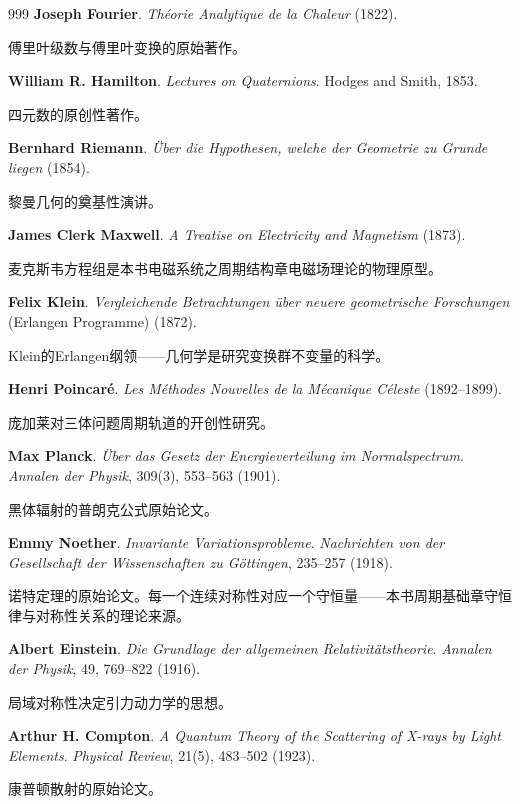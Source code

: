 \begin{thebibliography}{999}
 \textbf{Joseph Fourier}. \textit{Th\'eorie Analytique de la Chaleur} (1822).

傅里叶级数与傅里叶变换的原始著作。

 \textbf{William R. Hamilton}. \textit{Lectures on Quaternions}. Hodges and Smith, 1853.

四元数的原创性著作。

 \textbf{Bernhard Riemann}. \textit{\"Uber die Hypothesen, welche der Geometrie zu Grunde liegen} (1854).

黎曼几何的奠基性演讲。

 \textbf{James Clerk Maxwell}. \textit{A Treatise on Electricity and Magnetism} (1873).

麦克斯韦方程组是本书电磁系统之周期结构章电磁场理论的物理原型。

 \textbf{Felix Klein}. \textit{Vergleichende Betrachtungen \"uber neuere geometrische Forschungen} (Erlangen Programme) (1872).

Klein的Erlangen纲领——几何学是研究变换群不变量的科学。

 \textbf{Henri Poincar\'e}. \textit{Les M\'ethodes Nouvelles de la M\'ecanique C\'eleste} (1892--1899).

庞加莱对三体问题周期轨道的开创性研究。

 \textbf{Max Planck}. \textit{\"Uber das Gesetz der Energieverteilung im Normalspectrum}. \textit{Annalen der Physik}, 309(3), 553--563 (1901).

黑体辐射的普朗克公式原始论文。

 \textbf{Emmy Noether}. \textit{Invariante Variationsprobleme}. \textit{Nachrichten von der Gesellschaft der Wissenschaften zu G\"ottingen}, 235--257 (1918).

诺特定理的原始论文。每一个连续对称性对应一个守恒量——本书周期基础章守恒律与对称性关系的理论来源。

 \textbf{Albert Einstein}. \textit{Die Grundlage der allgemeinen Relativit\"atstheorie}. \textit{Annalen der Physik}, 49, 769--822 (1916).

局域对称性决定引力动力学的思想。

 \textbf{Arthur H. Compton}. \textit{A Quantum Theory of the Scattering of X-rays by Light Elements}. \textit{Physical Review}, 21(5), 483--502 (1923).

康普顿散射的原始论文。


\end{thebibliography}
